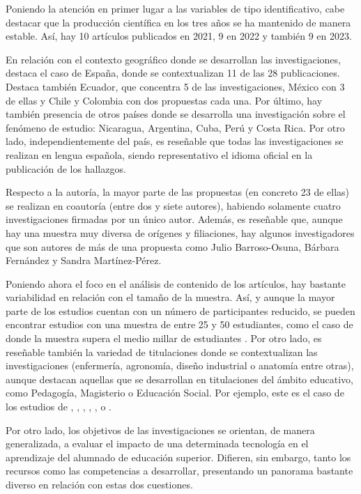 Poniendo la atención en primer lugar a las variables de tipo
identificativo, cabe destacar que la producción científica en los tres
años se ha mantenido de manera estable. Así, hay 10 artículos publicados
en 2021, 9 en 2022 y también 9 en 2023.

En relación con el contexto geográfico donde se desarrollan las
investigaciones, destaca el caso de España, donde se contextualizan 11
de las 28 publicaciones. Destaca también Ecuador, que concentra 5 de las
investigaciones, México con 3 de ellas y Chile y Colombia con dos
propuestas cada una. Por último, hay también presencia de otros países
donde se desarrolla una investigación sobre el fenómeno de estudio:
Nicaragua, Argentina, Cuba, Perú y Costa Rica. Por otro lado,
independientemente del país, es reseñable que todas las investigaciones
se realizan en lengua española, siendo representativo el idioma oficial
en la publicación de los hallazgos.

Respecto a la autoría, la mayor parte de las propuestas (en concreto 23
de ellas) se realizan en coautoría (entre dos y siete autores), habiendo
solamente cuatro investigaciones firmadas por un único autor. Además, es
reseñable que, aunque hay una muestra muy diversa de orígenes y
filiaciones, hay algunos investigadores que son autores de más de una
propuesta como Julio Barroso-Osuna, Bárbara Fernández y Sandra
Martínez-Pérez.

Poniendo ahora el foco en el análisis de contenido de los artículos, hay
bastante variabilidad en relación con el tamaño de la muestra. Así, y
aunque la mayor parte de los estudios cuentan con un número de
participantes reducido, se pueden encontrar estudios con una muestra de
entre 25 y 50 estudiantes, como el caso de \textcite{higaldocajo2021,andrade2022,marques2023} donde la muestra supera el medio millar de estudiantes \cite{davila2023,lopeznoguero2023}. Por otro lado, es reseñable
también la variedad de titulaciones donde se contextualizan las
investigaciones (enfermería, agronomía, diseño industrial o anatomía
entre otras), aunque destacan aquellas que se desarrollan en
titulaciones del ámbito educativo, como Pedagogía, Magisterio o
Educación Social. Por ejemplo, este es el caso de los estudios de
\textcite{diazramirez2023}, \textcite{villatoro2022}, \textcite{blasco2022}, \textcite{martinez2021}, \textcite{area2023}, \textcite{cabero2022} o \textcite{lagossanmartin2022}.

Por otro lado, los objetivos de las investigaciones se orientan, de
manera generalizada, a evaluar el impacto de una determinada tecnología
en el aprendizaje del alumnado de educación superior. Difieren, sin
embargo, tanto los recursos como las competencias a desarrollar,
presentando un panorama bastante diverso en relación con estas dos
cuestiones.

